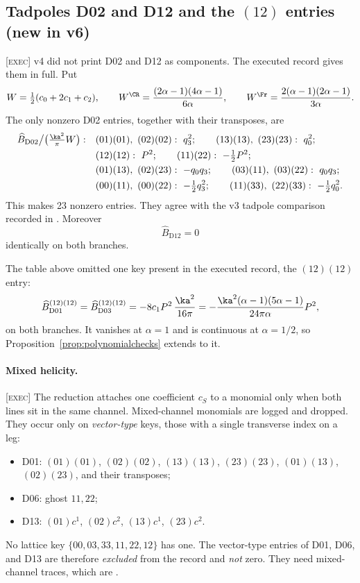 \subsection{Tadpoles D02 and D12 and the \texorpdfstring{\((12)\)}{(12)} entries (new in v6)}

\textsc{[exec]} v4 did not print D02 and D12 as components.
The executed record gives them in full.
Put
\[
W=\tfrac12(c_0+2c_1+c_2),\qquad
W^\CR=\frac{(2\alpha-1)(4\alpha-1)}{6\alpha},\qquad
W^\Fr=\frac{2(\alpha-1)(2\alpha-1)}{3\alpha}.
\]
The only nonzero D02 entries, together with their transposes, are
\begin{align*}
\widehat B_{\mathrm{D02}}\big/\bigl(\tfrac{\ka^2}{\pi}W\bigr):\quad
&(01)(01),\ (02)(02):\ q_3^2;\qquad
(13)(13),\ (23)(23):\ q_0^2;\\
&(12)(12):\ P^2;\qquad (11)(22):\ -\tfrac12P^2;\\
&(01)(13),\ (02)(23):\ -q_0q_3;\qquad
(03)(11),\ (03)(22):\ q_0q_3;\\
&(00)(11),\ (00)(22):\ -\tfrac12q_3^2;\qquad
(11)(33),\ (22)(33):\ -\tfrac12q_0^2.
\end{align*}
This makes 23 nonzero entries.
They agree with the v3 tadpole comparison recorded in
.
Moreover
\[
\widehat B_{\mathrm{D12}}=0
\]
identically on both branches.

The table above omitted one key present in the executed record,
the \((12)(12)\) entry:
\[
\widehat B_{\mathrm{D01}}^{(12)(12)}
=\widehat B_{\mathrm{D03}}^{(12)(12)}
=-8c_1P^2\,\frac{\ka^2}{16\pi}
=-\frac{\ka^2(\alpha-1)(5\alpha-1)}{24\pi\alpha}P^2,
\]
on both branches.
It vanishes at \(\alpha=1\) and is continuous at \(\alpha=1/2\), so
Proposition~\ref{prop:polynomialchecks} extends to it.

\paragraph{Mixed helicity.}
\textsc{[exec]} The reduction attaches one coefficient \(c_S\) to a
monomial only when both lines sit in the same channel.
Mixed-channel monomials are logged and dropped.
They occur only on \emph{vector-type} keys, those with a single
transverse index on a leg:
\begin{itemize}
\item D01: \((01)(01)\), \((02)(02)\), \((13)(13)\), \((23)(23)\),
\((01)(13)\), \((02)(23)\), and their transposes;
\item D06: ghost \(11,22\);
\item D13: \((01)c^1\), \((02)c^2\), \((13)c^1\), \((23)c^2\).
\end{itemize}
No lattice key \(\{00,03,33,11,22,12\}\) has one.
The vector-type entries of D01, D06, and D13 are therefore
\emph{excluded} from the record and \emph{not} zero.
They need mixed-channel traces, which are \OPEN.
